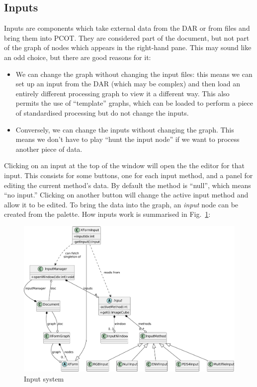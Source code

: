 \subsection{Inputs}
\label{inputs}
Inputs are components which take external data from the DAR or from files and
bring them into PCOT. They are considered part of the document, but not part
of the graph of nodes which appears in the right-hand pane. This may sound
like an odd choice, but there are good reasons for it:
\begin{itemize}
\item We can change the graph without changing the input files: this
means we can set up an input from the DAR (which may be complex) and
then load an entirely different processing graph to view it a different way.
This also permits the use of ``template'' graphs, which can be loaded
to perform a piece of standardised processing but do not change the inputs.
\item Conversely, we can change the inputs without changing the graph.
This means we don't have to play ``hunt the input node'' if we want
to process another piece of data.
\end{itemize}
Clicking on an input at the top of the window will open the the editor for
that input. This consists for some buttons, one for each input method, and a
panel for editing the current method's data. By default the method is
``null'', which means ``no input.'' Clicking on another button will change the
active input method and allow it to be edited.
To bring the data into the graph, an \emph{input} node can be created from
the palette.
How inputs work is summarised in Fig.~\ref{inputs.pdf}:
\begin{figure}[ht]
\center
\includegraphics[width=5in]{inputs.pdf}
\caption{Input system}
\label{inputs.pdf}
\end{figure}

